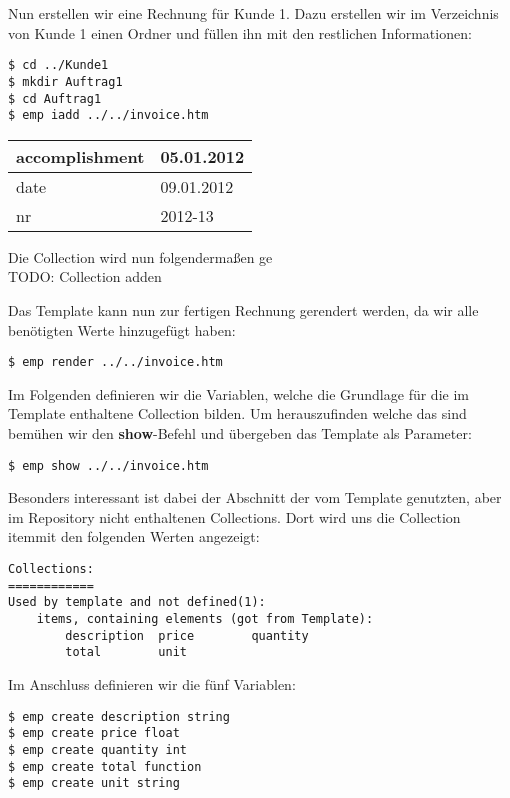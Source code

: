 Nun erstellen wir eine Rechnung für Kunde 1. Dazu erstellen wir im Verzeichnis von Kunde 1 einen Ordner und füllen ihn mit den restlichen Informationen:

\begin{lstlisting}[style=Bash]
$ cd ../Kunde1
$ mkdir Auftrag1
$ cd Auftrag1
$ emp iadd ../../invoice.htm
\end{lstlisting}

\begin{tabular}{| l | l |}
	\hline
	accomplishment & 05.01.2012 \\
	\hline
	date & 09.01.2012 \\
	\hline
	nr & 2012-13 \\
	\hline
\end{tabular}

Die Collection wird nun folgendermaßen ge\\
TODO: Collection adden

Das Template kann nun zur fertigen Rechnung gerendert werden, da wir alle benötigten Werte hinzugefügt haben:
\begin{lstlisting}[style=Bash]
$ emp render ../../invoice.htm
\end{lstlisting}

Im Folgenden definieren wir die Variablen, welche die Grundlage für die im Template enthaltene Collection bilden. Um herauszufinden welche das sind bemühen wir den \textbf{show}-Befehl und übergeben das Template als Parameter:
\begin{lstlisting}[style=Bash]
$ emp show ../../invoice.htm
\end{lstlisting}

Besonders interessant ist dabei der Abschnitt der vom Template genutzten, aber im Repository nicht enthaltenen Collections. Dort wird uns die Collection \grqq item\grqq mit den folgenden Werten angezeigt:

\begin{lstlisting}[style=Bash]
Collections:
============
Used by template and not defined(1):
	items, containing elements (got from Template):
		description  price        quantity
		total        unit
\end{lstlisting}

Im Anschluss definieren wir die fünf Variablen:
\begin{lstlisting}[style=Bash]
$ emp create description string
$ emp create price float
$ emp create quantity int
$ emp create total function
$ emp create unit string
\end{lstlisting}


